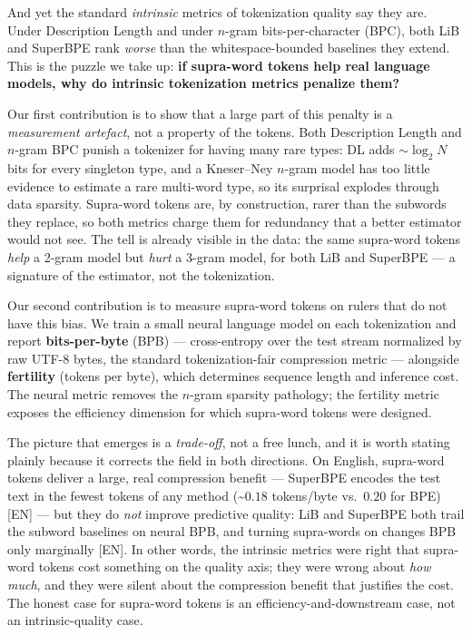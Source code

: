 And yet the standard \emph{intrinsic} metrics of tokenization quality say they
are.  Under Description Length and under $n$-gram bits-per-character (BPC), both
LiB and SuperBPE rank \emph{worse} than the whitespace-bounded baselines they
extend.  This is the puzzle we take up: \textbf{if supra-word tokens help real
language models, why do intrinsic tokenization metrics penalize them?}

Our first contribution is to show that a large part of this penalty is a
\emph{measurement artefact}, not a property of the tokens.  Both Description
Length and $n$-gram BPC punish a tokenizer for having many rare types: DL adds
$\sim\!\log_2 N$ bits for every singleton type, and a Kneser–Ney $n$-gram model
has too little evidence to estimate a rare multi-word type, so its surprisal
explodes through data sparsity.  Supra-word tokens are, by construction, rarer
than the subwords they replace, so both metrics charge them for redundancy that
a better estimator would not see.  The tell is already visible in the data: the
same supra-word tokens \emph{help} a 2-gram model but \emph{hurt} a 3-gram model,
for both LiB and SuperBPE — a signature of the estimator, not the tokenization.

Our second contribution is to measure supra-word tokens on rulers that do not
have this bias.  We train a small neural language model on each tokenization and
report \textbf{bits-per-byte} (BPB) — cross-entropy over the test stream
normalized by raw UTF-8 bytes, the standard tokenization-fair compression
metric — alongside \textbf{fertility} (tokens per byte), which determines
sequence length and inference cost.  The neural metric removes the $n$-gram
sparsity pathology; the fertility metric exposes the efficiency dimension for
which supra-word tokens were designed.

The picture that emerges is a \emph{trade-off}, not a free lunch, and it is
worth stating plainly because it corrects the field in both directions.  On
English, supra-word tokens deliver a large, real compression benefit —
SuperBPE encodes the test text in the fewest tokens of any method
(\textasciitilde$0.18$ tokens/byte vs.\ $0.20$ for BPE) [EN] — but they do
\emph{not} improve predictive quality: LiB and SuperBPE both trail the
subword baselines on neural BPB, and turning supra-words on changes BPB only
marginally [EN].  In other words, the intrinsic metrics were right that
supra-word tokens cost something on the quality axis; they were wrong about
\emph{how much}, and they were silent about the compression benefit that
justifies the cost.  The honest case for supra-word tokens is an
efficiency-and-downstream case, not an intrinsic-quality case.

